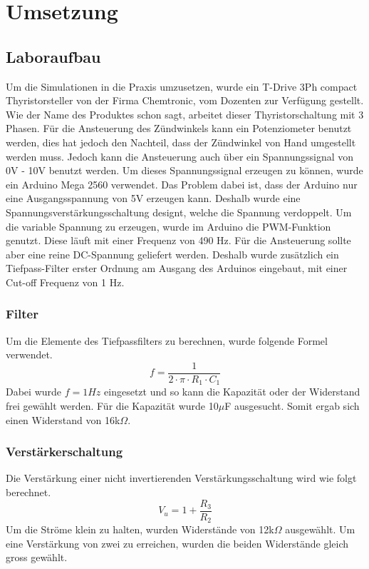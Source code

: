 \section{Umsetzung}


\subsection{Laboraufbau}
Um die Simulationen in die Praxis umzusetzen, wurde ein \grqq T-Drive 3Ph compact Thyristorsteller\grqq \hspace{0.03cm} von der Firma Chemtronic, vom Dozenten zur Verfügung gestellt. Wie der Name des Produktes schon sagt, arbeitet dieser Thyristorschaltung mit 3 Phasen. Für die Ansteuerung des Zündwinkels kann ein Potenziometer benutzt werden, dies hat jedoch den Nachteil, dass der Zündwinkel von Hand umgestellt werden muss. Jedoch kann die Ansteuerung auch über ein Spannungssignal von 0V - 10V benutzt werden. Um dieses Spannungssignal erzeugen zu können, wurde ein Arduino Mega 2560 verwendet. Das Problem dabei ist, dass der Arduino nur eine Ausgangsspannung von 5V erzeugen kann. Deshalb wurde eine Spannungsverstärkungsschaltung designt, welche die Spannung verdoppelt. Um die variable Spannung zu erzeugen, wurde im Arduino die PWM-Funktion genutzt. Diese läuft mit einer Frequenz von 490 Hz. Für die Ansteuerung sollte aber eine reine DC-Spannung geliefert werden. Deshalb wurde zusätzlich ein Tiefpass-Filter erster Ordnung am Ausgang des Arduinos eingebaut, mit einer Cut-off Frequenz von 1 Hz.  


\subsubsection{Filter}
Um die Elemente des Tiefpassfilters zu berechnen, wurde folgende Formel verwendet.
\begin{equation}
f = \frac{1}{2 \cdot \pi \cdot R_1 \cdot C_1}
\end{equation}
Dabei wurde $f = 1 Hz$ eingesetzt und so kann die Kapazität oder der Widerstand frei gewählt werden. Für die Kapazität wurde 10$\mu$F ausgesucht. Somit ergab sich einen Widerstand von 16k$\Omega$. 


\subsubsection{Verstärkerschaltung}
Die Verstärkung einer nicht invertierenden Verstärkungsschaltung wird wie folgt berechnet.
\begin{equation}
V_u = 1 + \frac{R_3}{R_2}
\end{equation}
Um die Ströme klein zu halten, wurden Widerstände von 12k$\Omega$ ausgewählt. Um eine Verstärkung von zwei zu erreichen, wurden die beiden Widerstände gleich gross gewählt. 

